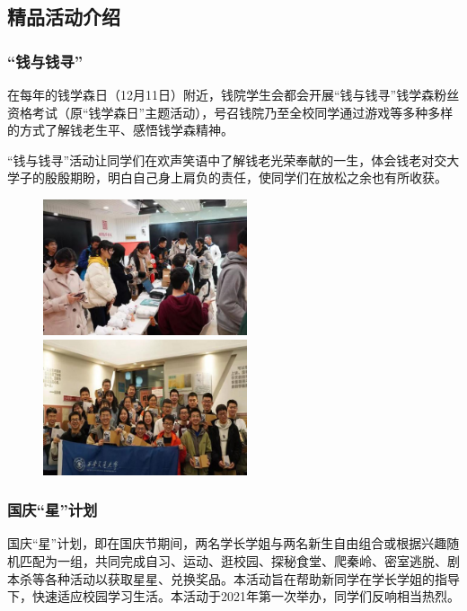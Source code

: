\documentclass[
decoration,  %
]{qyxf-book}
\begin{document}
	\subsection{精品活动介绍}
	
	\subsubsection{“钱与钱寻”}
	在每年的钱学森日（12月11日）附近，钱院学生会都会开展“钱与钱寻”钱学森粉丝资格考试（原“钱学森日”主题活动），号召钱院乃至全校同学通过游戏等多种多样的方式了解钱老生平、感悟钱学森精神。
	
    “钱与钱寻”活动让同学们在欢声笑语中了解钱老光荣奉献的一生，体会钱老对交大学子的殷殷期盼，明白自己身上肩负的责任，使同学们在放松之余也有所收获。
    
	\begin{figure}[htbp]
		\centering
		\begin{minipage}{6cm}
		\includegraphics[width=6cm]{pics/qyqx1.png}
		\end{minipage}
		\begin{minipage}{6cm}
		\includegraphics[width=6cm]{pics/qyqx2.png}
		\end{minipage}
	\end{figure}
	
	\subsubsection{国庆“星”计划}
	国庆“星”计划，即在国庆节期间，两名学长学姐与两名新生自由组合或根据兴趣随机匹配为一组，共同完成自习、运动、逛校园、探秘食堂、爬秦岭、密室逃脱、剧本杀等各种活动以获取星星、兑换奖品。本活动旨在帮助新同学在学长学姐的指导下，快速适应校园学习生活。本活动于2021年第一次举办，同学们反响相当热烈。
	
\end{document}
